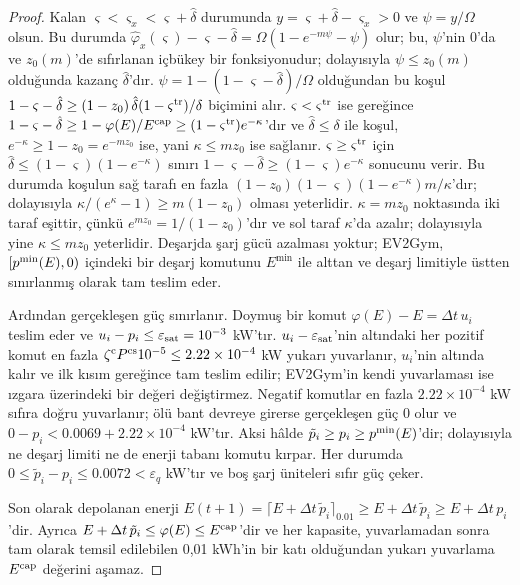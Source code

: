 \begin{proof}
Kalan $\varsigma<\varsigma_x<\varsigma+\hat\delta$ durumunda $y=\varsigma+\hat\delta-\varsigma_x>0$ ve $\psi=y/\Omega$ olsun.
Bu durumda $\hat\varphi_x(\varsigma)-\varsigma-\hat\delta=\Omega(1-e^{-m\psi}-\psi)$ olur; bu, $\psi$'nin 0'da ve $z_0(m)$'de sıfırlanan içbükey bir fonksiyonudur; dolayısıyla $\psi\le z_0(m)$ olduğunda kazanç $\hat\delta$'dır.
$\psi=1-(1-\varsigma-\hat\delta)/\Omega$ olduğundan bu koşul $1-\varsigma-\hat\delta\ge(1-z_0)\,\hat\delta(1-\varsigma^{\mathrm{tr}})/\delta$ biçimini alır.
$\varsigma<\varsigma^{\mathrm{tr}}$ ise  gereğince $1-\varsigma-\hat\delta\ge1-\varphi(E)/E^{\mathrm{cap}}\ge(1-\varsigma^{\mathrm{tr}})e^{-\kappa}$'dır ve $\hat\delta\le\delta$ ile koşul, $e^{-\kappa}\ge1-z_0=e^{-mz_0}$ ise, yani $\kappa\le mz_0$ ise sağlanır.
$\varsigma\ge\varsigma^{\mathrm{tr}}$ için $\hat\delta\le(1-\varsigma)(1-e^{-\kappa})$ sınırı $1-\varsigma-\hat\delta\ge(1-\varsigma)e^{-\kappa}$ sonucunu verir.
Bu durumda koşulun sağ tarafı en fazla $(1-z_0)(1-\varsigma)(1-e^{-\kappa})m/\kappa$'dır; dolayısıyla $\kappa/(e^{\kappa}-1)\ge m(1-z_0)$ olması yeterlidir.
$\kappa=mz_0$ noktasında iki taraf eşittir, çünkü $e^{mz_0}=1/(1-z_0)$'dır ve sol taraf $\kappa$'da azalır; dolayısıyla yine $\kappa\le mz_0$ yeterlidir.
Deşarjda şarj gücü azalması yoktur; EV2Gym, $[p^{\min}(E),0)$ içindeki bir deşarj komutunu $E^{\min}$ ile alttan ve deşarj limitiyle üstten sınırlanmış olarak tam teslim eder.

Ardından gerçekleşen güç sınırlanır.
Doymuş bir komut $\varphi(E)-E=\Delta t\,u_i$ teslim eder ve $u_i-p_i\le\varepsilon_{\mathrm{sat}}=10^{-3}$ kW'tır.
$u_i-\varepsilon_{\mathrm{sat}}$'nin altındaki her pozitif komut en fazla $\zeta^{\mathrm c}P^{\mathrm{cs}}10^{-5}\le2.22\times10^{-4}$ kW yukarı yuvarlanır, $u_i$'nin altında kalır ve ilk kısım gereğince tam teslim edilir; EV2Gym'in kendi yuvarlaması ise ızgara üzerindeki bir değeri değiştirmez.
Negatif komutlar en fazla $2.22\times10^{-4}$ kW sıfıra doğru yuvarlanır; ölü bant devreye girerse gerçekleşen güç 0 olur ve $0-p_i<0.0069+2.22\times10^{-4}$ kW'tır.
Aksi hâlde $\tilde p_i\ge p_i\ge p^{\min}(E)$'dir; dolayısıyla ne deşarj limiti ne de enerji tabanı komutu kırpar.
Her durumda $0\le\tilde p_i-p_i\le0.0072<\varepsilon_q$ kW'tır ve boş şarj üniteleri sıfır güç çeker.

Son olarak depolanan enerji $E(t+1)=\lceil E+\Delta t\,\tilde p_i\rceil_{0.01}\ge E+\Delta t\,\tilde p_i\ge E+\Delta t\,p_i$'dir.
Ayrıca $E+\Delta t\,\tilde p_i\le\varphi(E)\le E^{\mathrm{cap}}$'dir ve her kapasite, yuvarlamadan sonra tam olarak temsil edilebilen 0,01 kWh'in bir katı olduğundan yukarı yuvarlama $E^{\mathrm{cap}}$ değerini aşamaz.
\end{proof}

